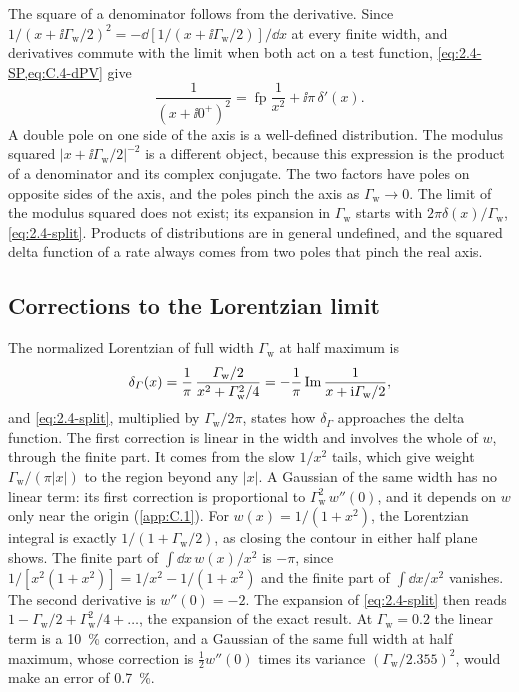 The square of a denominator follows from the derivative. Since $1/(x + \ii\varGamma_{\mathrm{w}}/2)^2 = -\dd[1/(x + \ii\varGamma_{\mathrm{w}}/2)]/\dd x$ at every finite width, and derivatives commute with the limit when both act on a test function, \cref{eq:2.4-SP,eq:C.4-dPV} give
\begin{equation}
  \frac{1}{(x + \ii0^+)^2} = \operatorname{fp}\frac{1}{x^2} + \ii\pi\,\delta'(x) .
  \label{eq:C.4-square}
\end{equation}
A double pole on one side of the axis is a well-defined distribution. The modulus squared $|x + \ii\varGamma_{\mathrm{w}}/2|^{-2}$ is a different object, because this expression is the product of a denominator and its complex conjugate. The two factors have poles on opposite sides of the axis, and the poles pinch the axis as $\varGamma_{\mathrm{w}}\to0$. The limit of the modulus squared does not exist; its expansion in $\varGamma_{\mathrm{w}}$ starts with $2\pi\delta(x)/\varGamma_{\mathrm{w}}$, \cref{eq:2.4-split}. Products of distributions are in general undefined, and the squared delta function of a rate always comes from two poles that pinch the real axis.

\subsection{Corrections to the Lorentzian limit}

The normalized Lorentzian of full width $\varGamma_{\mathrm{w}}$ at half maximum is
\begin{equation}
  \delta_{\varGamma}(x) = \frac{1}{\pi}\,\frac{\varGamma_{\mathrm{w}}/2}{x^2 + \varGamma_{\mathrm{w}}^2/4} = -\frac1\pi\operatorname{Im}\frac{1}{x + \mathrm{i}\varGamma_{\mathrm{w}}/2} ,
  \label{eq:C.4-lorentz}
\end{equation}
and \cref{eq:2.4-split}, multiplied by $\varGamma_{\mathrm{w}}/2\pi$, states how $\delta_{\varGamma}$ approaches the delta function. The first correction is linear in the width and involves the whole of $w$, through the finite part. It comes from the slow $1/x^2$ tails, which give weight $\varGamma_{\mathrm{w}}/(\pi|x|)$ to the region beyond any $|x|$. A Gaussian of the same width has no linear term: its first correction is proportional to $\varGamma_{\mathrm{w}}^2\,w''(0)$, and it depends on $w$ only near the origin (\cref{app:C.1}). For $w(x) = 1/(1 + x^2)$, the Lorentzian integral is exactly $1/(1 + \varGamma_{\mathrm{w}}/2)$, as closing the contour in either half plane shows. The finite part of $\int\dd x\,w(x)/x^2$ is $-\pi$, since $1/[x^2(1 + x^2)] = 1/x^2 - 1/(1 + x^2)$ and the finite part of $\int\dd x/x^2$ vanishes. The second derivative is $w''(0) = -2$. The expansion of \cref{eq:2.4-split} then reads $1 - \varGamma_{\mathrm{w}}/2 + \varGamma_{\mathrm{w}}^2/4 + \dots$, the expansion of the exact result. At $\varGamma_{\mathrm{w}} = 0.2$ the linear term is a \SI{10}{\percent} correction, and a Gaussian of the same full width at half maximum, whose correction is $\tfrac12w''(0)$ times its variance $(\varGamma_{\mathrm{w}}/2.355)^2$, would make an error of \SI{0.7}{\percent}.

